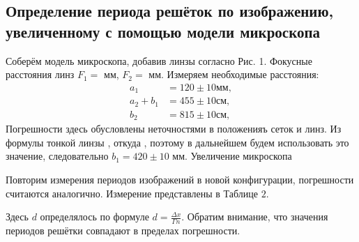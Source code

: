  
\subsection*{Определение периода решёток по изображению, увеличенному с помощью модели микроскопа}
  
Соберём модель микроскопа, добавив линзы согласно Рис. 1. Фокусные расстояния линз $F_{1}=  $ мм, $F_{2}= $ мм. Измеряем необходимые расстояния:
$$
\begin{aligned}
a_{1} &= 120  \pm 10 \mathrm{мм}, \\
a_{2}+b_{1} &= 455 \pm 10 \mathrm{см}, \\
b_{2} &= 815 \pm 10 \mathrm{см},
\end{aligned}
$$
Погрешности здесь обусловлены неточностями в положенияъ сеток и линз. Из формулы тонкой линзы , откуда , поэтому в дальнейшем будем использовать это значение, следовательно $b_{1}= 420\pm 10$ мм.  Увеличение микроскопа 

Повторим измерения периодов изображений в новой конфигурации, погрешности считаются аналогично. Измерение представлены в Таблице $2 .$

Здесь $d$ определялось по формуле $d=\frac{\Delta x}{\Gamma n}$. Обратим внимание, что значения периодов решётки совпадают в пределах погрешности.

